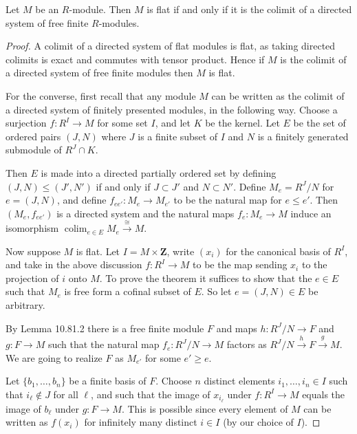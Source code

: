 \begin{theorem}
Let $M$ be an $R$-module. Then $M$ is flat if and only if it is the colimit of a directed system of free finite $R$-modules.
\end{theorem}
\begin{proof}
A colimit of a directed system of flat modules is flat, as taking directed colimits is exact and commutes with tensor product. Hence if $M$ is the colimit of a directed system of free finite modules then $M$ is flat.

For the converse, first recall that any module $M$ can be written as the colimit of a directed system of finitely presented modules, in the following way. Choose a surjection $f:R^I\to M$ for some set $I$, and let $K$ be the kernel. Let $E$ be the set of ordered pairs $(J,N)$ where $J$ is a finite subset of $I$ and $N$ is a finitely generated submodule of $R^J\cap K$.

Then $E$ is made into a directed partially ordered set by defining $(J,N)\leq(J',N')$ if and only if $J\subset J'$ and $N\subset N'$. Define $M_e=R^J/N$ for $e=(J,N)$, and define $f_{ee'}:M_e\to M_{e'}$ to be the natural map for $e\leq e'$. Then $(M_e,f_{ee'})$ is a directed system and the natural maps $f_e:M_e\to M$ induce an isomorphism $\operatorname{colim}_{e\in E}M_e\xrightarrow{\cong}M$.

Now suppose $M$ is flat. Let $I=M\times\mathbf Z$, write $(x_i)$ for the canonical basis of $R^I$, and take in the above discussion $f:R^I\to M$ to be the map sending $x_i$ to the projection of $i$ onto $M$. To prove the theorem it suffices to show that the $e\in E$ such that $M_e$ is free form a cofinal subset of $E$. So let $e=(J,N)\in E$ be arbitrary.

By Lemma 10.81.2 there is a free finite module $F$ and maps $h:R^J/N\to F$ and $g:F\to M$ such that the natural map $f_e:R^J/N\to M$ factors as $R^J/N\xrightarrow{h}F\xrightarrow{g}M$. We are going to realize $F$ as $M_{e'}$ for some $e'\geq e$.

Let $\{b_1,\ldots,b_n\}$ be a finite basis of $F$. Choose $n$ distinct elements $i_1,\ldots,i_n\in I$ such that $i_\ell\notin J$ for all $\ell$, and such that the image of $x_{i_\ell}$ under $f:R^I\to M$ equals the image of $b_\ell$ under $g:F\to M$. This is possible since every element of $M$ can be written as $f(x_i)$ for infinitely many distinct $i\in I$ (by our choice of $I$).


\end{proof}
